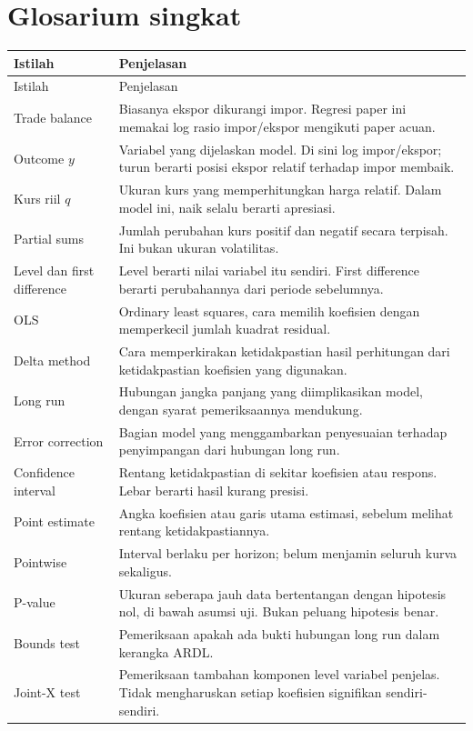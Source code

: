 \clearpage\section{Glosarium singkat}
\begin{longtable}{p{.26\linewidth}p{.63\linewidth}}
\toprule Istilah & Penjelasan\\\midrule\endfirsthead
\toprule Istilah & Penjelasan\\\midrule\endhead
Trade balance & Biasanya ekspor dikurangi impor. Regresi paper ini memakai log rasio impor/ekspor mengikuti paper acuan.\\
Outcome $y$ & Variabel yang dijelaskan model. Di sini log impor/ekspor; turun berarti posisi ekspor relatif terhadap impor membaik.\\
Kurs riil $q$ & Ukuran kurs yang memperhitungkan harga relatif. Dalam model ini, naik selalu berarti apresiasi.\\
Partial sums & Jumlah perubahan kurs positif dan negatif secara terpisah. Ini bukan ukuran volatilitas.\\
Level dan first difference & Level berarti nilai variabel itu sendiri. First difference berarti perubahannya dari periode sebelumnya.\\
OLS & Ordinary least squares, cara memilih koefisien dengan memperkecil jumlah kuadrat residual.\\
Delta method & Cara memperkirakan ketidakpastian hasil perhitungan dari ketidakpastian koefisien yang digunakan.\\
Long run & Hubungan jangka panjang yang diimplikasikan model, dengan syarat pemeriksaannya mendukung.\\
Error correction & Bagian model yang menggambarkan penyesuaian terhadap penyimpangan dari hubungan long run.\\
Confidence interval & Rentang ketidakpastian di sekitar koefisien atau respons. Lebar berarti hasil kurang presisi.\\
Point estimate & Angka koefisien atau garis utama estimasi, sebelum melihat rentang ketidakpastiannya.\\
Pointwise & Interval berlaku per horizon; belum menjamin seluruh kurva sekaligus.\\
P-value & Ukuran seberapa jauh data bertentangan dengan hipotesis nol, di bawah asumsi uji. Bukan peluang hipotesis benar.\\
Bounds test & Pemeriksaan apakah ada bukti hubungan long run dalam kerangka ARDL.\\
Joint-X test & Pemeriksaan tambahan komponen level variabel penjelas. Tidak mengharuskan setiap koefisien signifikan sendiri-sendiri.\\

\end{longtable}
